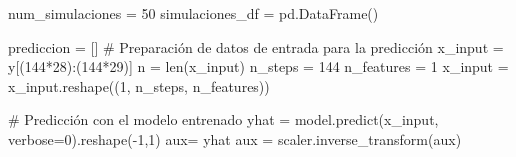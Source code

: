 \documentclass[
  us-letterpaper,
]{scrreprt}
\newenvironment{Shaded}{\begin{snugshade}}{\end{snugshade}}
\newcommand{\BuiltInTok}[1]{\textcolor[rgb]{0.00,0.23,0.31}{#1}}
\newcommand{\CommentTok}[1]{\textcolor[rgb]{0.37,0.37,0.37}{#1}}
\newcommand{\DecValTok}[1]{\textcolor[rgb]{0.68,0.00,0.00}{#1}}
\newcommand{\NormalTok}[1]{\textcolor[rgb]{0.00,0.23,0.31}{#1}}
\newcommand{\OperatorTok}[1]{\textcolor[rgb]{0.37,0.37,0.37}{#1}}
\theoremstyle{plain}
\theoremstyle{definition}
\theoremstyle{definition}
\theoremstyle{remark}
\begin{document}
\begin{Shaded}
\begin{Highlighting}[]
\NormalTok{num\_simulaciones }\OperatorTok{=} \DecValTok{50}
\NormalTok{simulaciones\_df }\OperatorTok{=}\NormalTok{ pd.DataFrame()}

\NormalTok{prediccion }\OperatorTok{=}\NormalTok{ []}
\CommentTok{\# Preparación de datos de entrada para la predicción}
\NormalTok{x\_input }\OperatorTok{=}\NormalTok{ y[(}\DecValTok{144}\OperatorTok{*}\DecValTok{28}\NormalTok{):(}\DecValTok{144}\OperatorTok{*}\DecValTok{29}\NormalTok{)]}
\NormalTok{n }\OperatorTok{=} \BuiltInTok{len}\NormalTok{(x\_input)}
\NormalTok{n\_steps }\OperatorTok{=} \DecValTok{144}
\NormalTok{n\_features }\OperatorTok{=} \DecValTok{1}
\NormalTok{x\_input }\OperatorTok{=}\NormalTok{  x\_input.reshape((}\DecValTok{1}\NormalTok{, n\_steps, n\_features))}

\CommentTok{\# Predicción con el modelo entrenado}
\NormalTok{yhat }\OperatorTok{=}\NormalTok{ model.predict(x\_input, verbose}\OperatorTok{=}\DecValTok{0}\NormalTok{).reshape(}\OperatorTok{{-}}\DecValTok{1}\NormalTok{,}\DecValTok{1}\NormalTok{)}
\NormalTok{aux}\OperatorTok{=}\NormalTok{ yhat}
\NormalTok{aux }\OperatorTok{=}\NormalTok{ scaler.inverse\_transform(aux)}



\end{Highlighting}
\end{Shaded}
\end{document}
